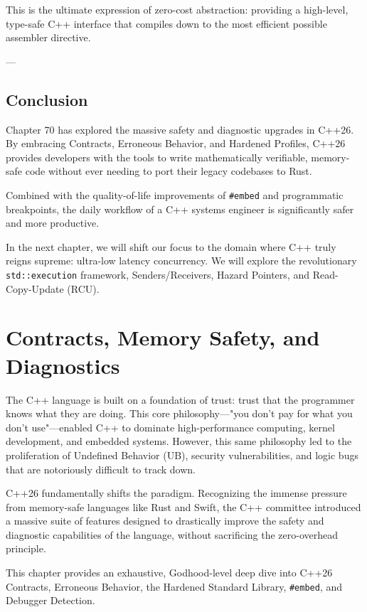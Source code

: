 {{This is the ultimate expression of zero-cost abstraction: providing a high-level, type-safe C++ interface that compiles down to the most efficient possible assembler directive.

---

\section{Conclusion}

Chapter 70 has explored the massive safety and diagnostic upgrades in C++26. By embracing Contracts, Erroneous Behavior, and Hardened Profiles, C++26 provides developers with the tools to write mathematically verifiable, memory-safe code without ever needing to port their legacy codebases to Rust.

Combined with the quality-of-life improvements of \texttt{#embed} and programmatic breakpoints, the daily workflow of a C++ systems engineer is significantly safer and more productive.

In the next chapter, we will shift our focus to the domain where C++ truly reigns supreme: ultra-low latency concurrency. We will explore the revolutionary \texttt{std::execution} framework, Senders/Receivers, Hazard Pointers, and Read-Copy-Update (RCU).
\chapter{Contracts, Memory Safety, and Diagnostics}

The C++ language is built on a foundation of trust: trust that the programmer knows what they are doing. This core philosophy—"you don't pay for what you don't use"—enabled C++ to dominate high-performance computing, kernel development, and embedded systems. However, this same philosophy led to the proliferation of Undefined Behavior (UB), security vulnerabilities, and logic bugs that are notoriously difficult to track down.

C++26 fundamentally shifts the paradigm. Recognizing the immense pressure from memory-safe languages like Rust and Swift, the C++ committee introduced a massive suite of features designed to drastically improve the safety and diagnostic capabilities of the language, without sacrificing the zero-overhead principle.

This chapter provides an exhaustive, Godhood-level deep dive into C++26 Contracts, Erroneous Behavior, the Hardened Standard Library, \texttt{#embed}, and Debugger Detection.

}}
